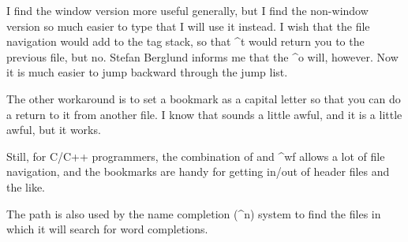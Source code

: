 \documentclass[a4paper, 12pt]{article}
\begin{document}
      I find the window version more useful generally, but I find the non-window version so much easier to type that I will use it instead. I wish that the file navigation would add to the tag stack, so that ^t would return you to the previous file, but no. Stefan Berglund informs me that the ^o will, however. Now it is much easier to jump backward through the jump list.

      The other workaround is to set a bookmark as a capital letter so that you can do a return to it from another file. I know that sounds a little awful, and it is a little awful, but it works.

      Still, for C/C++ programmers, the combination of \K and ^wf allows a lot of file navigation, and the bookmarks are handy for getting in/out of header files and the like.

      The path is also used by the name completion (^n) system to find the files in which it will search for word completions.
\end{document}
